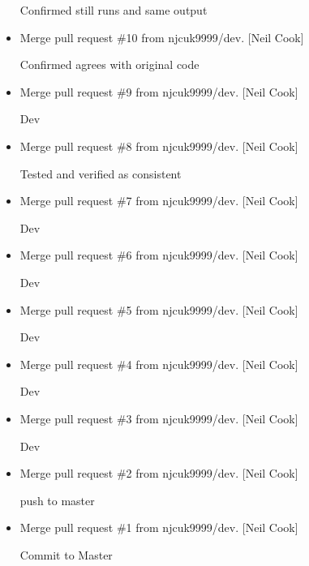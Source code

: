 \documentclass[a4paper,10pt,english]{report}
\begin{document}
\begin{itemize}
Confirmed still runs and same output

\item {} 
Merge pull request \#10 from njcuk9999/dev. {[}Neil Cook{]}

Confirmed agrees with original code

\item {} 
Merge pull request \#9 from njcuk9999/dev. {[}Neil Cook{]}

Dev

\item {} 
Merge pull request \#8 from njcuk9999/dev. {[}Neil Cook{]}

Tested and verified as consistent

\item {} 
Merge pull request \#7 from njcuk9999/dev. {[}Neil Cook{]}

Dev

\item {} 
Merge pull request \#6 from njcuk9999/dev. {[}Neil Cook{]}

Dev

\item {} 
Merge pull request \#5 from njcuk9999/dev. {[}Neil Cook{]}

Dev

\item {} 
Merge pull request \#4 from njcuk9999/dev. {[}Neil Cook{]}

Dev

\item {} 
Merge pull request \#3 from njcuk9999/dev. {[}Neil Cook{]}

Dev

\item {} 
Merge pull request \#2 from njcuk9999/dev. {[}Neil Cook{]}

push to master

\item {} 
Merge pull request \#1 from njcuk9999/dev. {[}Neil Cook{]}

Commit to Master

\end{itemize}
\end{document}
